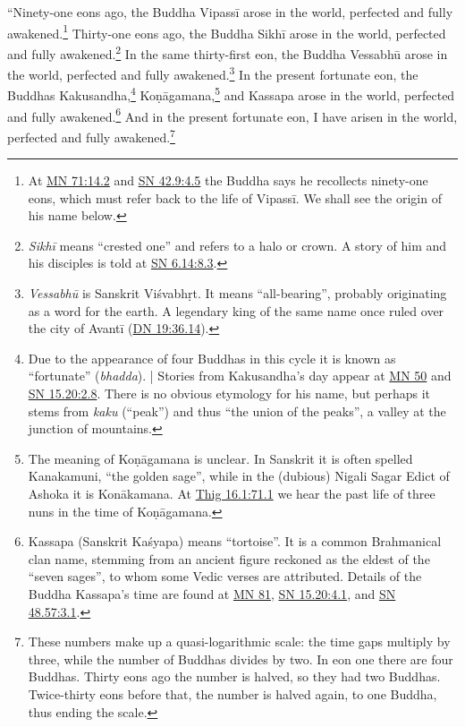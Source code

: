 \documentclass[12pt,openany]{book}%
\begin{document}
“Ninety-one eons ago, the Buddha \textsanskrit{Vipassī} arose in the world, perfected and fully awakened.\footnote{At \href{https://suttacentral.net/mn71/en/sujato\#14.2}{MN 71:14.2} and \href{https://suttacentral.net/sn42.9/en/sujato\#4.5}{SN 42.9:4.5} the Buddha says he recollects ninety-one eons, which must refer back to the life of \textsanskrit{Vipassī}. We shall see the origin of his name below. } Thirty-one eons ago, the Buddha \textsanskrit{Sikhī} arose in the world, perfected and fully awakened.\footnote{\textit{\textsanskrit{Sikhī}} means “crested one” and refers to a halo or crown. A story of him and his disciples is told at \href{https://suttacentral.net/sn6.14/en/sujato\#8.3}{SN 6.14:8.3}. } In the same thirty-first eon, the Buddha \textsanskrit{Vessabhū} arose in the world, perfected and fully awakened.\footnote{\textit{\textsanskrit{Vessabhū}} is Sanskrit \textsanskrit{Viśvabhṛt}. It means “all-bearing”, probably originating as a word for the earth. A legendary king of the same name once ruled over the city of \textsanskrit{Avantī} (\href{https://suttacentral.net/dn19/en/sujato\#36.14}{DN 19:36.14}). } In the present fortunate eon, the Buddhas Kakusandha,\footnote{Due to the appearance of four Buddhas in this cycle it is known as “fortunate” (\textit{bhadda}). | Stories from Kakusandha’s day appear at \href{https://suttacentral.net/mn50/en/sujato}{MN 50} and \href{https://suttacentral.net/sn15.20/en/sujato\#2.8}{SN 15.20:2.8}. There is no obvious etymology for his name, but perhaps it stems from \textit{kaku} (“peak”) and thus “the union of the peaks”, a valley at the junction of mountains. } \textsanskrit{Koṇāgamana},\footnote{The meaning of \textsanskrit{Koṇāgamana} is unclear. In Sanskrit it is often spelled Kanakamuni, “the golden sage”, while in the (dubious) Nigali Sagar Edict of Ashoka it is \textsanskrit{Konākamana}. At \href{https://suttacentral.net/thig16.1/en/sujato\#71.1}{Thig 16.1:71.1} we hear the past life of three nuns in the time of \textsanskrit{Koṇāgamana}. } and Kassapa arose in the world, perfected and fully awakened.\footnote{Kassapa (Sanskrit \textsanskrit{Kaśyapa}) means “tortoise”. It is a common Brahmanical clan name, stemming from an ancient figure reckoned as the eldest of the “seven sages”, to whom some Vedic verses are attributed. Details of the Buddha Kassapa’s time are found at \href{https://suttacentral.net/mn81/en/sujato}{MN 81}, \href{https://suttacentral.net/sn15.20/en/sujato\#4.1}{SN 15.20:4.1}, and \href{https://suttacentral.net/sn48.57/en/sujato\#3.1}{SN 48.57:3.1}. } And in the present fortunate eon, I have arisen in the world, perfected and fully awakened.\footnote{These numbers make up a quasi-logarithmic scale: the time gaps multiply by three, while the number of Buddhas divides by two. In eon one there are four Buddhas. Thirty eons ago the number is halved, so they had two Buddhas. Twice-thirty eons before that, the number is halved again, to one Buddha, thus ending the scale. } 
\end{document}
